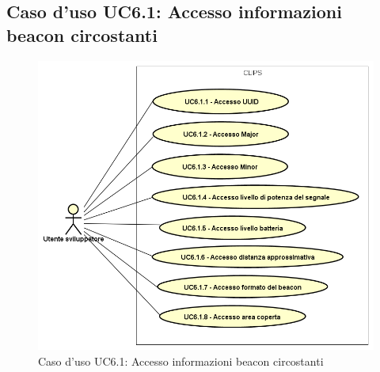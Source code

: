 \documentclass[../AnalisiDeiRequisiti.tex]{subfiles}
\begin{document}
\subsection{Caso d'uso UC6.1: Accesso informazioni beacon circostanti}

        \begin{figure}[H]
            \centering
            \includegraphics[scale=0.95, width=\textwidth]{img/UC6-1.png}
            \caption{Caso d'uso UC6.1: Accesso informazioni beacon circostanti}\label{fig:UC6.1} 
        \end{figure}
\end{document}
